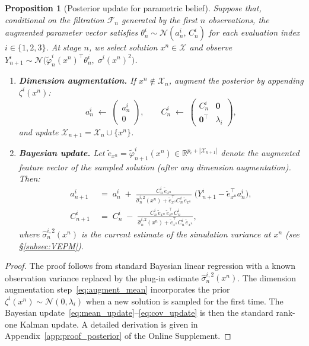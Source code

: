 \documentclass[12pt]{article}
\theoremstyle{plain}
\newtheorem{proposition}{Proposition}[section]
\theoremstyle{definition}
\theoremstyle{remark}
\begin{document}
\begin{proposition}[Posterior update for parametric belief]\label{prop:posterior_update}
Suppose that, conditional on the filtration $\mathcal{F}_n$ generated by the first $n$ observations, the augmented parameter vector satisfies $\theta^i_n \sim \mathcal{N}(a^i_n,\, C^i_n)$ for each evaluation index $i \in \{1,2,3\}$. At stage $n$, we select solution $x^n \in \mathcal{X}$ and observe $Y^i_{n+1} \sim \mathcal{N}\bigl(\tilde{\varphi}^i_n(x^n)^\top \theta^i_n,\; \sigma^i(x^n)^2\bigr)$.

\begin{enumerate}[label=(\alph*)]
\item \textbf{Dimension augmentation.} If $x^n \notin \mathcal{X}_n$, augment the posterior by appending $\zeta^i(x^n)$:
\begin{equation}\label{eq:augment_mean}
  a^i_n \;\leftarrow\; \begin{pmatrix} a^i_n \\ 0 \end{pmatrix}, \qquad
  C^i_n \;\leftarrow\; \begin{pmatrix} C^i_n & \mathbf{0} \\ \mathbf{0}^\top & \lambda_i \end{pmatrix},
\end{equation}
and update $\mathcal{X}_{n+1} = \mathcal{X}_n \cup \{x^n\}$.

\item \textbf{Bayesian update.} Let $\tilde{e}_{x^n} = \tilde{\varphi}^i_{n+1}(x^n) \in \mathbb{R}^{p_i + |\mathcal{X}_{n+1}|}$ denote the augmented feature vector of the sampled solution (after any dimension augmentation). Then:
\begin{align}
  a^i_{n+1} &\;=\; a^i_n \;+\; \frac{C^i_n\, \tilde{e}_{x^n}}{\hat{\sigma}^{i,2}_n(x^n) + \tilde{e}_{x^n}^\top C^i_n\, \tilde{e}_{x^n}} \;\bigl(Y^i_{n+1} - \tilde{e}_{x^n}^\top a^i_n\bigr), \label{eq:mean_update} \\[6pt]
  C^i_{n+1} &\;=\; C^i_n \;-\; \frac{C^i_n\, \tilde{e}_{x^n}\, \tilde{e}_{x^n}^\top C^i_n}{\hat{\sigma}^{i,2}_n(x^n) + \tilde{e}_{x^n}^\top C^i_n\, \tilde{e}_{x^n}}, \label{eq:cov_update}
\end{align}
where $\hat{\sigma}^{i,2}_n(x^n)$ is the current estimate of the simulation variance at $x^n$ (see \S\ref{subsec:VEPM}).
\end{enumerate}
\end{proposition}

\begin{proof}
The proof follows from standard Bayesian linear regression with a known observation variance replaced by the plug-in estimate $\hat{\sigma}^{i,2}_n(x^n)$. The dimension augmentation step~\eqref{eq:augment_mean} incorporates the prior $\zeta^i(x^n) \sim \mathcal{N}(0, \lambda_i)$ when a new solution is sampled for the first time. The Bayesian update~\eqref{eq:mean_update}--\eqref{eq:cov_update} is then the standard rank-one Kalman update. A detailed derivation is given in Appendix~\ref{app:proof_posterior} of the Online Supplement.
\end{proof}
\end{document}
